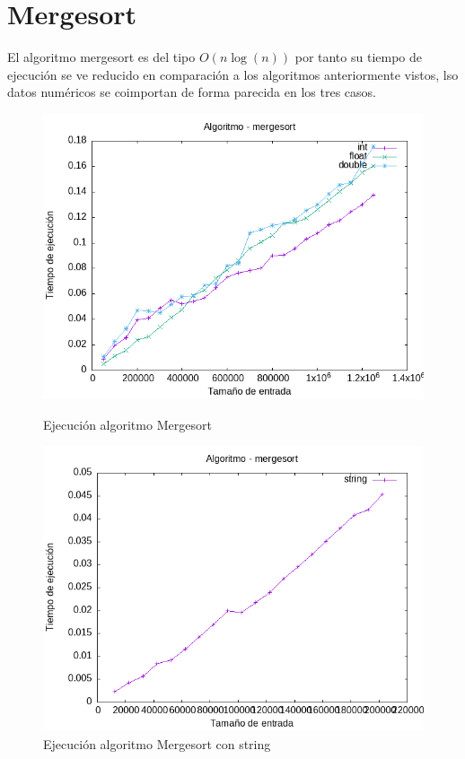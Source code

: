 \documentclass[11pt,openany]{book}
\begin{document}
\section*{Mergesort}
El algoritmo mergesort es del tipo $O(n\log(n))$ por tanto su tiempo de ejecución se ve reducido en comparación a los algoritmos 
anteriormente vistos, lso datos numéricos se coimportan de forma parecida en los tres casos.
\begin{figure}[H]
    \begin{minipage}{0.5\textwidth}
        \centering
        \includegraphics[width=\linewidth]{assets/Img/mergesort.png}
        \caption{Ejecución algoritmo Mergesort}
        \label{fig:mergesort}
    \end{minipage}%
    \begin{minipage}{0.5\textwidth}
        \centering
        \includegraphics[width=\linewidth]{assets/Img/mergesortstring.png}
        \caption{Ejecución algoritmo Mergesort con string}
        \label{fig:mergesortstring}
    \end{minipage}
\end{figure}
\end{document}

